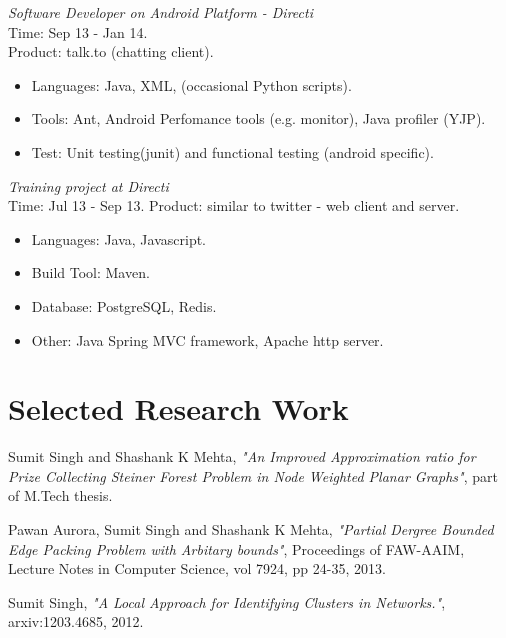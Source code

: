 \documentclass[margin,line]{resume}
\begin{document}
\begin{resume}
\textit{Software Developer on Android Platform - Directi} \\
Time: Sep 13 - Jan 14.\\
Product: talk.to (chatting client).\\
\begin{itemize}
\item Languages: Java, XML, (occasional Python scripts).\\
\item Tools: Ant, Android Perfomance tools (e.g. monitor), Java profiler (YJP).\\
\item Test: Unit testing(junit) and functional testing (android specific).
 \end{itemize}

\textit{Training project at Directi}\\
Time: Jul 13 - Sep 13.
Product: similar to twitter - web client and server.\\
 \begin{itemize}
\item Languages: Java, Javascript.
\item Build Tool: Maven.
\item Database: PostgreSQL, Redis.
\item Other: Java Spring MVC framework, Apache http server.  
 \end{itemize}




    \section{\mysidestyle Selected Research Work}
\vspace{-2mm}
Sumit Singh and Shashank K Mehta, \textit{ "An Improved Approximation ratio for Prize Collecting Steiner Forest Problem in Node Weighted Planar Graphs"}, part of M.Tech thesis.

\vspace{-2mm}
Pawan Aurora, Sumit Singh and Shashank K Mehta, \textit{"Partial Dergree Bounded Edge Packing Problem with Arbitary bounds"}, Proceedings of FAW-AAIM, Lecture Notes in Computer Science, vol 7924, pp 24-35, 2013. 

\vspace{-2mm}
Sumit Singh, \textit{"A Local Approach for Identifying Clusters in Networks."}, arxiv:1203.4685, 2012.


\end{resume}
\end{document}
